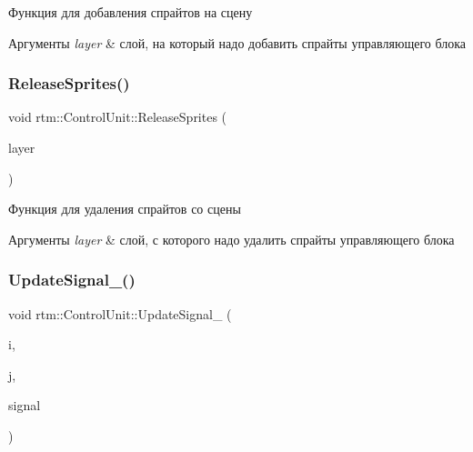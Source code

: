 Функция для добавления спрайтов на сцену 


\begin{DoxyParams}{Аргументы}
{\em layer} & слой, на который надо добавить спрайты управляющего блока \\
\hline
\end{DoxyParams}
\mbox{\label{classrtm_1_1_control_unit_ac21d7c91d9c62fb58f29b2412ce4d4be}} 
\subsubsection{\texorpdfstring{Release\+Sprites()}{ReleaseSprites()}}
{\footnotesize\ttfamily void rtm\+::\+Control\+Unit\+::\+Release\+Sprites (\begin{DoxyParamCaption}\item[{cocos2d\+::\+Layer $\ast$const}]{layer }\end{DoxyParamCaption})}



Функция для удаления спрайтов со сцены 


\begin{DoxyParams}{Аргументы}
{\em layer} & слой, с которого надо удалить спрайты управляющего блока \\
\hline
\end{DoxyParams}
\mbox{\label{classrtm_1_1_control_unit_afacb521a6f7297b932a48edbbf0a10b2}} 
\subsubsection{\texorpdfstring{Update\+Signal\+\_\+()}{UpdateSignal\_()}}
{\footnotesize\ttfamily void rtm\+::\+Control\+Unit\+::\+Update\+Signal\+\_\+ (\begin{DoxyParamCaption}\item[{size\+\_\+t}]{i,  }\item[{size\+\_\+t}]{j,  }\item[{\hyperlink{namespacertm_aadb7300c15d57429546fb0b7f8ee0ee6}{Signal\+Type}}]{signal }\end{DoxyParamCaption})\hspace{0.3cm}{\ttfamily [private]}}



